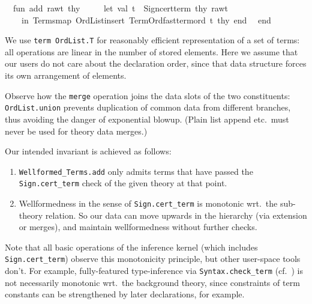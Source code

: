 \begin{isabellebody}
\isanewline
\ \ fun\ add\ raw{\isacharunderscore}t\ thy\ {\isacharequal}\isanewline
\ \ \ \ let\ val\ t\ {\isacharequal}\ Sign{\isachardot}cert{\isacharunderscore}term\ thy\ raw{\isacharunderscore}t\isanewline
\ \ \ \ in\ Terms{\isachardot}map\ {\isacharparenleft}OrdList{\isachardot}insert\ Term{\isacharunderscore}Ord{\isachardot}fast{\isacharunderscore}term{\isacharunderscore}ord\ t{\isacharparenright}\ thy\ end{\isacharsemicolon}\isanewline
\isanewline
\ \ end{\isacharsemicolon}\isanewline
{\isacharverbatimclose}%
\endisatagML
{\isafoldML}%
%
\isadelimML
%
\endisadelimML
%
\begin{isamarkuptext}%
We use \verb|term OrdList.T| for reasonably efficient
  representation of a set of terms: all operations are linear in the
  number of stored elements.  Here we assume that our users do not
  care about the declaration order, since that data structure forces
  its own arrangement of elements.

  Observe how the \verb|merge| operation joins the data slots of
  the two constituents: \verb|OrdList.union| prevents duplication of
  common data from different branches, thus avoiding the danger of
  exponential blowup.  (Plain list append etc.\ must never be used for
  theory data merges.)

  \medskip Our intended invariant is achieved as follows:
  \begin{enumerate}

  \item \verb|Wellformed_Terms.add| only admits terms that have passed
  the \verb|Sign.cert_term| check of the given theory at that point.

  \item Wellformedness in the sense of \verb|Sign.cert_term| is
  monotonic wrt.\ the sub-theory relation.  So our data can move
  upwards in the hierarchy (via extension or merges), and maintain
  wellformedness without further checks.

  \end{enumerate}

  Note that all basic operations of the inference kernel (which
  includes \verb|Sign.cert_term|) observe this monotonicity principle,
  but other user-space tools don't.  For example, fully-featured
  type-inference via \verb|Syntax.check_term| (cf.\
  ) is not necessarily monotonic wrt.\ the
  background theory, since constraints of term constants can be
  strengthened by later declarations, for example.


\end{isamarkuptext}
\end{isabellebody}
